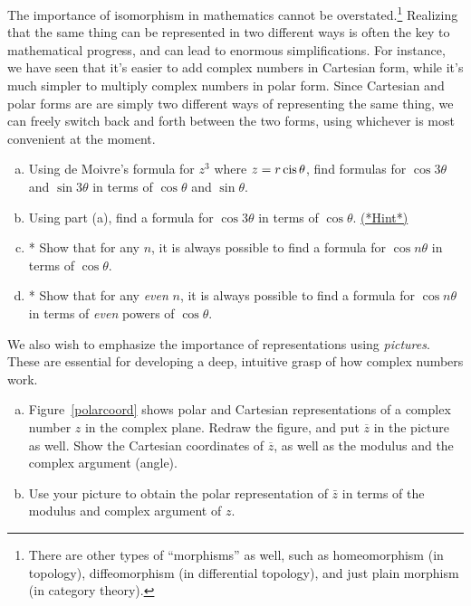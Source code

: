 The importance of isomorphism in mathematics cannot be overstated.\footnote{There are other types of ``morphisms'' as well, such as homeomorphism (in topology), diffeomorphism (in differential topology), and just plain morphism (in category theory).}  Realizing that the same thing can be represented in two different ways is often the key to mathematical progress, and can lead to enormous simplifications. For instance, we have seen that it's  easier to add complex numbers in Cartesian form, while it's much simpler to multiply complex numbers in polar form.  Since Cartesian and polar forms are are simply two different ways of representing the same thing, we can freely switch back and forth between the two forms, using whichever is most convenient at the moment. 

\begin{exercise}\label{exercise:complex:cos form}
\begin{enumerate}[(a)]
 \item
Using de Moivre's formula for $z^3$ where $z = r \operatorname{cis} \theta$, find formulas for $\cos 3 \theta$ and $\sin 3 \theta$ in terms of $\cos \theta$ and $\sin \theta$.  
\item
Using part (a), find a formula for $\cos 3 \theta$ in terms of $\cos \theta$.  
\hyperref[sec:complex:hints]{(*Hint*)}
\item
* Show that for any $n$, it is always possible to find a formula for $\cos n\theta$ in terms of $\cos \theta$.
\item
* Show that for any \emph{even} $n$, it is always possible to find a formula for $\cos n\theta$ in terms of \emph{even} powers of $\cos \theta$.
\end{enumerate}
\end{exercise}

We also wish to emphasize the importance of representations using \emph{pictures}.  These are essential for developing a deep, intuitive grasp of how complex numbers work.

\begin{exercise}\label{exercise:complex:cos form2}
\begin{enumerate}[(a)]
\item
Figure~\ref{polarcoord} shows  polar and Cartesian representations of a complex number $z$  in the complex plane.  Redraw the figure, and put $\overline{z}$ in the picture as well. Show the Cartesian coordinates of $\overline{z}$, as well as the modulus and the complex argument (angle).
\item
Use your picture to obtain the polar representation of $\bar{z}$ in terms of the modulus and complex argument of $z$.
\end{enumerate}
\end{exercise}

